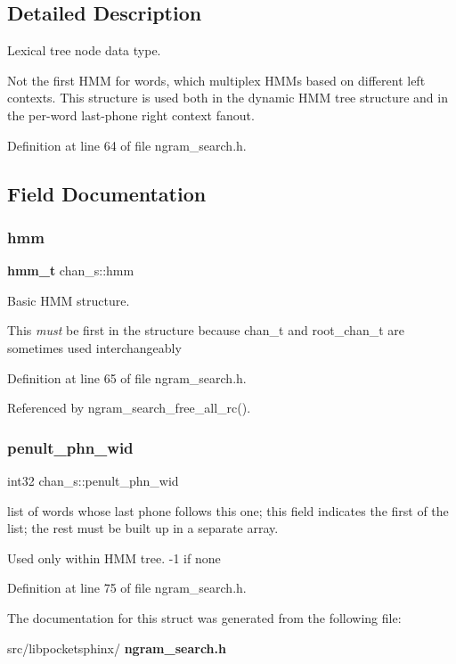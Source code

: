 \subsection{Detailed Description}
Lexical tree node data type. 

Not the first H\+MM for words, which multiplex H\+M\+Ms based on different left contexts. This structure is used both in the dynamic H\+MM tree structure and in the per-\/word last-\/phone right context fanout. 

Definition at line 64 of file ngram\+\_\+search.\+h.



\subsection{Field Documentation}
\mbox{\label{structchan__s_a742d6a125ac468b95a1ddd880a956e35}} 
\subsubsection{hmm}
{\footnotesize\ttfamily \textbf{ hmm\+\_\+t} chan\+\_\+s\+::hmm}



Basic H\+MM structure. 

This {\itshape must} be first in the structure because chan\+\_\+t and root\+\_\+chan\+\_\+t are sometimes used interchangeably 

Definition at line 65 of file ngram\+\_\+search.\+h.



Referenced by ngram\+\_\+search\+\_\+free\+\_\+all\+\_\+rc().

\mbox{\label{structchan__s_a136796f6a13c0d6989120f9aa25b85f1}} 
\subsubsection{penult\+\_\+phn\+\_\+wid}
{\footnotesize\ttfamily int32 chan\+\_\+s\+::penult\+\_\+phn\+\_\+wid}



list of words whose last phone follows this one; this field indicates the first of the list; the rest must be built up in a separate array. 

Used only within H\+MM tree. -\/1 if none 

Definition at line 75 of file ngram\+\_\+search.\+h.



The documentation for this struct was generated from the following file\+:\begin{DoxyCompactItemize}
\item 
src/libpocketsphinx/\textbf{ ngram\+\_\+search.\+h}\end{DoxyCompactItemize}
